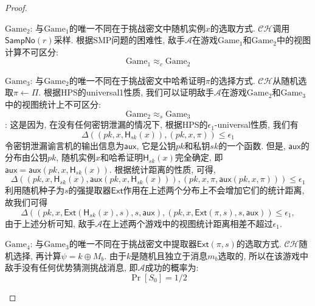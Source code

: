 \begin{proof}
\begin{trivlist}
\item $\text{Game}_2$: 与$\text{Game}_1$的唯一不同在于挑战密文中随机实例$x$的选取方式. 
	$\mathcal{CH}$调用$\mathsf{SampNo}(r)$采样. 根据SMP问题的困难性, 敌手$\mathcal{A}$在游戏$\text{Game}_1$和$\text{Game}_2$中的视图计算不可区分:
    \begin{equation*}
        \text{Game}_1 \approx_c \text{Game}_2
    \end{equation*} 

\item $\text{Game}_3$: 与$\text{Game}_2$的唯一不同在于挑战密文中哈希证明$\pi$的选择方式. $\mathcal{CH}$从随机选取$\pi\leftarrow\Pi$. 根据HPS的universal1性质, 我们可以证明敌手$\mathcal{A}$在游戏$\text{Game}_2$和$\text{Game}_3$中的视图统计上不可区分:
    \begin{equation*}
        \text{Game}_2 \approx_s \text{Game}_3
    \end{equation*} :
这是因为, 在没有任何密钥泄漏的情况下, 根据HPS的$\epsilon_1$-universal性质, 我们有
\begin{equation*}
	\Delta((pk, x, \mathsf{H}_{sk}(x)), (pk, x, \pi))\leq \epsilon_1
\end{equation*}
令密钥泄漏谕言机的输出信息为$\mathsf{aux}$, 它是公钥$pk$和私钥$sk$的一个函数. 但是, $\mathsf{aux}$的分布由公钥$pk$, 随机实例$x$和哈希证明$\mathsf{H}_{sk}(x)$完全确定, 即$\mathsf{aux} = \mathsf{aux}(pk, x, \mathsf{H}_{sk}(x))$. 根据统计距离的性质, 可得,
\begin{equation*}
	\Delta((pk, x, \mathsf{H}_{sk}(x), \mathsf{aux}(pk, x, \mathsf{H}_{sk}(x))), (pk, x, \pi, \mathsf{aux}(pk, x, \pi)))\leq \epsilon_1
\end{equation*}
利用随机种子为$s$的强提取器$\mathsf{Ext}$作用在上述两个分布上不会增加它们的统计距离, 故我们可得
\begin{equation*}
	\Delta((pk, x, \mathsf{Ext}(\mathsf{H}_{sk}(x), s), s, \mathsf{aux}), (pk, x, \mathsf{Ext}(\pi, s), s, \mathsf{aux}))\leq \epsilon_1,
\end{equation*}
由于上述分析可知, 敌手$\mathcal{A}$在上述两个游戏中的视图统计距离相差不超过$\epsilon_1$.

\item $\text{Game}_4$: 与$\text{Game}_3$的唯一不同在于挑战密文中提取器$\mathsf{Ext}(\pi, s)$的选取方式. $\mathcal{CH}$随机选择, 再计算$\psi=k\oplus M_b$. 
由于$k$是随机且独立于消息$m_b$选取的, 所以在该游戏中敌手没有任何优势猜测挑战消息, 即$\mathcal{A}$成功的概率为:
\begin{equation*}
	\Pr[S_0] = 1/2
\end{equation*}


\end{trivlist}
\end{proof}
